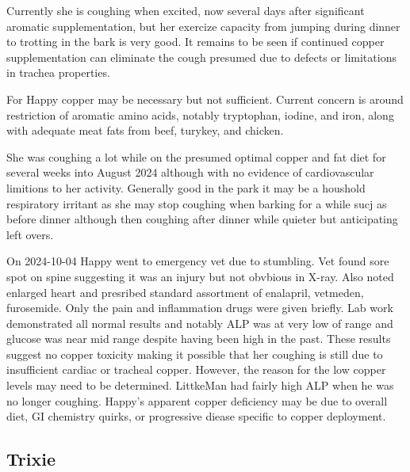 Currently
she is coughing when excited, now several days after   significant
aromatic supplementation, but her exercize capacity from
jumping during dinner to trotting in the bark is very good.
It remains to be seen if continued copper supplementation can
eliminate the cough presumed due to defects or limitations in 
trachea properties.  

For Happy copper may be necessary but not sufficient. 
Current concern is around restriction of aromatic amino
acids, notably tryptophan, iodine, and iron, along with
adequate meat fats from beef, turykey, and chicken. 

She was coughing a lot while on the presumed optimal
copper and fat diet for several weeks into August
2024 although with no evidence of cardiovascular
limitions to her activity. Generally good in the park
it may be a houshold respiratory irritant  as she
may stop coughing when barking for a while  sucj as before
dinner although then coughing after dinner while quieter
but anticipating left overs. 

On 2024-10-04 Happy went to emergency vet due to stumbling.
Vet found sore spot on spine suggesting it was an injury
but not obvbious in X-ray. Also noted enlarged heart and presribed
standard assortment of enalapril, vetmeden, furosemide. Only the
pain and inflammation drugs were given briefly. Lab work 
demonstrated all normal results and notably ALP was at very
low of range and glucose was near mid range despite having
been high in the past.  These results suggest no copper
toxicity making it possible that her coughing is still
due to insufficient cardiac or tracheal copper. However, the
reason for the low copper levels may need to be determined.
LittkeMan had fairly high ALP when he was no longer coughing.
Happy's apparent copper deficiency may be due to overall diet,
GI chemistry quirks, or progressive diease specific to copper
deployment. 


\mjmhappymisc



\subsection{Trixie}

